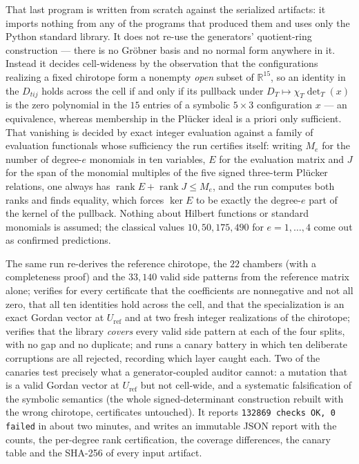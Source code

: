 \documentclass[11pt]{amsart}
\theoremstyle{remark}
\begin{document}
That last program is written from scratch against the serialized
artifacts: it imports nothing from any of the programs that produced
them and uses only the Python standard library. It does not re-use the
generators' quotient-ring construction --- there is no Gr\"obner basis
and no normal form anywhere in it. Instead it decides cell-wideness by
the observation that the configurations realizing a fixed chirotope
form a nonempty \emph{open} subset of $\mathbb{R}^{15}$, so an identity
in the $D_{tij}$ holds across the cell if and only if its pullback
under $D_{T}\mapsto \chi_{T}\det_{T}(x)$ is the zero polynomial in the
$15$ entries of a symbolic $5\times3$ configuration $x$ --- an
equivalence, whereas membership in the Pl\"ucker ideal is a priori only
sufficient. That vanishing is decided by exact integer evaluation
against a family of evaluation functionals whose sufficiency the run
certifies itself: writing $M_e$ for the number of degree-$e$ monomials
in ten variables, $E$ for the evaluation matrix and $J$ for the span of
the monomial multiples of the five signed three-term Pl\"ucker
relations, one always has $\operatorname{rank}E+\operatorname{rank}J\le
M_e$, and the run computes both ranks and finds equality, which forces
$\ker E$ to be exactly the degree-$e$ part of the kernel of the
pullback. Nothing about Hilbert functions or standard monomials is
assumed; the classical values $10,50,175,490$ for $e=1,\dots,4$ come
out as confirmed predictions.

The same run re-derives the reference chirotope, the $22$ chambers
(with a completeness proof) and the $33{,}140$ valid side patterns from
the reference matrix alone; verifies for every certificate that the
coefficients are nonnegative and not all zero, that all ten identities
hold across the cell, and that the specialization is an exact Gordan
vector at $U_{\mathrm{ref}}$ and at two fresh integer realizations of
the chirotope; verifies that the library \emph{covers} every valid side
pattern at each of the four splits, with no gap and no duplicate; and
runs a canary battery in which ten deliberate corruptions are all
rejected, recording which layer caught each. Two of the canaries test
precisely what a generator-coupled auditor cannot: a mutation that is a
valid Gordan vector at $U_{\mathrm{ref}}$ but not cell-wide, and a
systematic falsification of the symbolic semantics (the whole
signed-determinant construction rebuilt with the wrong chirotope,
certificates untouched). It reports
\texttt{132869 checks OK, 0 failed} in about two minutes, and writes
an immutable JSON report with the counts, the per-degree rank
certification, the coverage differences, the canary table and the
SHA-256 of every input artifact.
\end{document}
